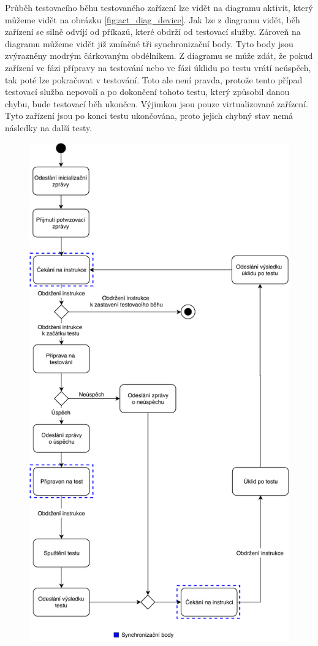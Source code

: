 Průběh testovacího běhu testovaného zařízení lze vidět na diagramu aktivit, který můžeme vidět na obrázku \ref{fig:act_diag_device}. Jak lze z diagramu vidět, běh zařízení se silně odvíjí od příkazů, které obdrží od testovací služby. Zároveň na diagramu můžeme vidět již zmíněné tři synchronizační body. Tyto body jsou zvýrazněny modrým čárkovaným obdélníkem. Z diagramu se může zdát, že pokud zařízení ve fázi přípravy na testování nebo ve fázi úklidu po testu vrátí neúspěch, tak poté lze pokračovat v testování. Toto ale není pravda, protože tento případ testovací služba nepovolí a po dokončení tohoto testu, který způsobil danou chybu, bude testovací běh ukončen. Výjimkou jsou pouze virtualizované zařízení. Tyto zařízení jsou po konci testu ukončována, proto jejich chybný stav nemá následky na další testy.

\begin{figure}
    \centering 
    \includegraphics[height=0.98\textheight]{assets/img/activitydiagramdevice.pdf}

\end{figure}
